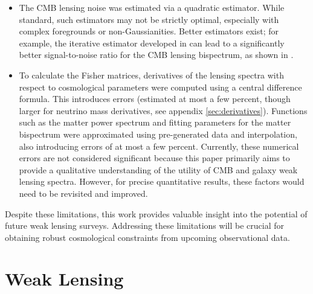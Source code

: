\documentclass[11pt]{article} %
\begin{document}
\begin{itemize}
    \item The CMB lensing noise was estimated via a quadratic estimator. While standard, such estimators may not be strictly optimal, especially with complex foregrounds or non-Gaussianities. Better estimators exist; for example, the iterative estimator developed in \cite{Smith_2012} can lead to a significantly better signal-to-noise ratio for the CMB lensing bispectrum, as shown in \cite{Namikawa_2016}.
    \item To calculate the Fisher matrices, derivatives of the lensing spectra with respect to cosmological parameters were computed using a central difference formula.  This introduces errors (estimated at most a few percent, though larger for neutrino mass derivatives, see appendix \ref{sec:derivatives}). Functions such as the matter power spectrum and fitting parameters for the matter bispectrum were approximated using pre-generated data and interpolation, also introducing errors of at most a few percent. Currently, these numerical errors are not considered significant because this paper primarily aims to provide a qualitative understanding of the utility of CMB and galaxy weak lensing spectra.  However, for precise quantitative results, these factors would need to be revisited and improved.
\end{itemize}

Despite these limitations, this work provides valuable insight into the potential of future weak lensing surveys. Addressing these limitations will be crucial for obtaining robust cosmological constraints from upcoming observational data.

\printbibliography

\appendix

\section{Weak Lensing}\label{sec:weaklensing}
\end{document}
